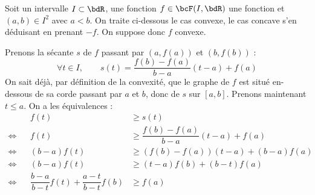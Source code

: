 \documentclass[a4paper,french,bookmarks]{article}
\begin{document}
\begin{nproof}
    Soit un intervalle $I \subset \bdR$, une fonction $f \in \bcF(I, \bdR)$ une fonction et $(a, b) \in I^2$ avec $a < b$. On traite ci-dessous le cas convexe, le cas concave s'en déduisant en prenant $-f$. On suppose donc $f$ convexe.
    
    \begin{minipage}{0.55\linewidth}
        Prenons la sécante $s$ de $f$ passant par $\left(a, f(a)\right)$ et $\left(b, f(b)\right)$ :
        \[ \forall t \in I,\qquad s(t) = \dfrac{f(b)-f(a)}{b-a}(t-a) + f(a)\]
        On sait déjà, par définition de la convexité, que le graphe de $f$ est situé en-dessous de sa corde passant par $a$ et $b$, donc de $s$ sur $[a, b]$. Prenons maintenant $t \leq a$. On a les équivalences :
        \begin{align*} 
            && f(t) &\geq s(t)\\
            \iff&& f(t) &\geq \dfrac{f(b)-f(a)}{b-a}(t-a) + f(a)\\
            \iff&& (b-a)f(t) &\geq \left(f(b)-f(a)\right)(t-a) + (b-a)f(a)\\
            \iff&& (b-a)f(t) &\geq (t-a)f(b) + (b-t)f(a)\\
            \iff&& \dfrac{b-a}{b-t}f(t) + \dfrac{a-t}{b-t}f(b) &\geq f(a)
        \end{align*}
    \end{minipage}
    \hfill
    \begin{minipage}{0.4\linewidth}
        \pgfplotsset{width=\linewidth}
\end{minipage}
\end{nproof}
\end{document}
